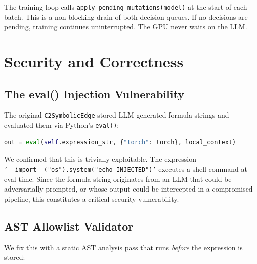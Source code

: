 \documentclass[11pt,a4paper]{article}
\begin{document}
The training loop calls \texttt{apply\_pending\_mutations(model)} at the start of each batch. This is a non-blocking drain of both decision queues. If no decisions are pending, training continues uninterrupted. The GPU never waits on the LLM.

\section{Security and Correctness}
\label{sec:security}

\subsection{The eval() Injection Vulnerability}

The original \texttt{C2SymbolicEdge} stored LLM-generated formula strings and evaluated them via Python's \texttt{eval()}:
\begin{lstlisting}[language=Python]
out = eval(self.expression_str, {"torch": torch}, local_context)
\end{lstlisting}
We confirmed that this is trivially exploitable. The expression \texttt{'\_\_import\_\_("os").system("echo INJECTED")'} executes a shell command at eval time. Since the formula string originates from an LLM that could be adversarially prompted, or whose output could be intercepted in a compromised pipeline, this constitutes a critical security vulnerability.

\subsection{AST Allowlist Validator}

We fix this with a static AST analysis pass that runs \emph{before} the expression is stored:
\end{document}
